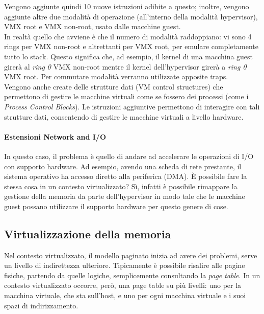 \documentclass{article}
\begin{document}
		Vengono aggiunte quindi 10 nuove istruzioni adibite a questo; inoltre, vengono aggiunte
		altre due modalità di operazione (all’interno della modalità hypervisor), VMX root e VMX
		non-root, usato dalle macchine guest.\\
		In realtà quello che avviene è che il numero di modalità raddoppiano: vi sono 4 rings per
		VMX non-root e altrettanti per VMX root, per emulare completamente tutto lo stack.
		Questo significa che, ad esempio, il kernel di una macchina guest girerà al
		\emph{ring 0} VMX non-root mentre il kernel dell’hypervisor girerà a \emph{ring 0} VMX root. Per commutare 
		modalità verranno utilizzate apposite traps.\\
		
		Vengono anche create delle strutture dati (VM control structures) che
		permettono di gestire le macchine virtuali come se fossero dei processi (come i \textit{Process Control Blocks}).
		Le istruzioni aggiuntive permettono di
		interagire con tali strutture dati, consentendo di gestire le macchine virtuali a
		livello hardware.
		
		\paragraph{Estensioni Network and I/O}
		In questo caso, il problema è quello di andare ad accelerare le operazioni di I/O con
		supporto hardware. Ad esempio, avendo una scheda di rete prestante, il sistema
		operativo ha accesso diretto alla periferica (DMA). È possibile fare la stessa cosa in un
		contesto virtualizzato? Sì, infatti è possibile rimappare la gestione della memoria da
		parte dell’hypervisor in modo tale che le macchine guest possano utilizzare il supporto
		hardware per questo genere di cose.
		
		\subsection{Virtualizzazione della memoria}
		Nel contesto virtualizzato, il modello paginato inizia ad avere dei problemi, serve un livello
		di indirettezza ulteriore.
		Tipicamente è possibile risalire alle pagine fisiche, partendo da quelle logiche, semplicemente consultando la \emph{page table}. In un contesto virtualizzato occorre, però, una page table su più livelli: uno per la macchina virtuale, che sta sull’host, e
		uno per ogni macchina virtuale e i suoi spazi di indirizzamento.\\
		
\end{document}

